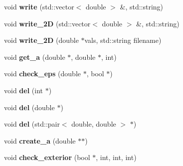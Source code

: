 \begin{DoxyCompactItemize}
\item 
void {\bfseries write} (std\+::vector$<$ double $>$ \&, std\+::string)\hypertarget{classSolver_a3aea87f02ba29399f566a44aa6329942}{}\label{classSolver_a3aea87f02ba29399f566a44aa6329942}

\item 
void {\bfseries write\+\_\+2D} (std\+::vector$<$ double $>$ \&, std\+::string)\hypertarget{classSolver_a70288ca19a07085c42116ad1115f1c6c}{}\label{classSolver_a70288ca19a07085c42116ad1115f1c6c}

\item 
void {\bfseries write\+\_\+2D} (double $\ast$vals, std\+::string filename)\hypertarget{classSolver_a428a48baa11f5530c442bb2aa8de73aa}{}\label{classSolver_a428a48baa11f5530c442bb2aa8de73aa}

\item 
void {\bfseries get\+\_\+a} (double $\ast$, double $\ast$, int)\hypertarget{classSolver_a12b589b62d1354f402e9d4bd6de0109a}{}\label{classSolver_a12b589b62d1354f402e9d4bd6de0109a}

\item 
void {\bfseries check\+\_\+eps} (double $\ast$, bool $\ast$)\hypertarget{classSolver_afa8d3f8bf9ab9e379111eaa6dafc7de9}{}\label{classSolver_afa8d3f8bf9ab9e379111eaa6dafc7de9}

\item 
void {\bfseries del} (int $\ast$)\hypertarget{classSolver_ad66df5d232f0c04e4b8467fb65927e1e}{}\label{classSolver_ad66df5d232f0c04e4b8467fb65927e1e}

\item 
void {\bfseries del} (double $\ast$)\hypertarget{classSolver_a982ee85405686716231c715e9411bb95}{}\label{classSolver_a982ee85405686716231c715e9411bb95}

\item 
void {\bfseries del} (std\+::pair$<$ double, double $>$ $\ast$)\hypertarget{classSolver_ae9120b4a8988af81958011426f9b1a7b}{}\label{classSolver_ae9120b4a8988af81958011426f9b1a7b}

\item 
void {\bfseries create\+\_\+a} (double $\ast$$\ast$)\hypertarget{classSolver_a7885df3c61b622913fbef2ad4301c603}{}\label{classSolver_a7885df3c61b622913fbef2ad4301c603}

\item 
void {\bfseries check\+\_\+exterior} (bool $\ast$, int, int, int)\hypertarget{classSolver_a2def6a66bb6086556af38868bee73198}{}\label{classSolver_a2def6a66bb6086556af38868bee73198}


\end{DoxyCompactItemize}
